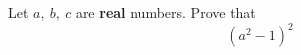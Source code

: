 \documentclass[12pt,a4paper]{book}
\begin{document}
\begin{pro_no_count}
Let $a, \ b, \ c$ are \textbf{real} numbers. Prove that
\[(a^2-1)^2\]
\end{pro_no_count}
\end{document}
